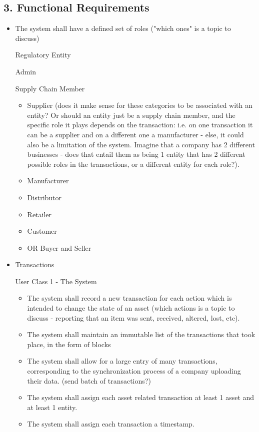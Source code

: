 \subsection*{3. Functional  Requirements}
\begin{itemize}
	\item The system shall have a defined set of roles ("which ones" is a topic to discuss)
		\par Regulatory Entity
		\par Admin
        \par Supply Chain Member
        \begin{itemize}
			\item Supplier  (does it make sense for these categories to be associated with an entity? Or should an entity just be a supply chain member, and the specific role it plays depends on the transaction: i.e. on one transaction it can be a supplier and on a different one a manufacturer - else, it could also be a limitation of the system. Imagine that a company has 2 different businesses - does that entail them as being 1 entity that has 2 different possible roles in the transactions, or a different entity for each role?).
			\item  Manufacturer
			\item Distributor
			\item Retailer
			\item Customer
			\item OR  Buyer and Seller
		\end{itemize}
    \item Transactions
        \par User Class 1 - The System
        \begin{itemize}
			\item The system shall record a new transaction for each action which is intended to change the state of an asset (which actions is a topic to discuss - reporting that an item was sent, received, altered, lost, etc).
			\item The system shall maintain an immutable list of the transactions that took place, in the form of blocks
			\item The system shall allow for a large entry of many transactions, corresponding to the synchronization process of a company uploading their data. (send batch of transactions?)
			\item The system shall assign each asset related transaction at least 1 asset and  at least 1 entity.
			\item The system shall assign each transaction a timestamp.

\end{itemize}
\end{itemize}

